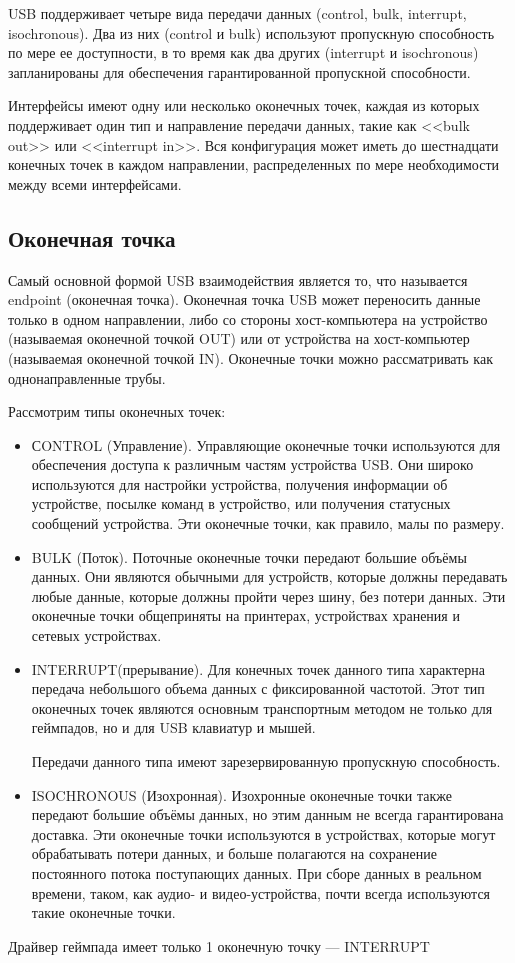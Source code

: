 USB поддерживает четыре вида передачи данных (control, bulk, interrupt, isochronous). Два из них (control и bulk) используют пропускную способность по мере ее доступности, в то время как два других (interrupt и isochronous) запланированы для обеспечения гарантированной пропускной способности.\par
Интерфейсы имеют одну или несколько оконечных точек, каждая из которых поддерживает один тип и направление передачи данных, такие как <<bulk out>> или <<interrupt in>>. Вся конфигурация может иметь до шестнадцати конечных точек в каждом направлении, распределенных по мере необходимости между всеми интерфейсами.\par

\subsection{Оконечная точка}
Самый основной формой USB взаимодействия является то, что называется endpoint
(оконечная точка). Оконечная точка USB может переносить данные только в одном
направлении, либо со стороны хост-компьютера на устройство (называемая оконечной точкой
OUT) или от устройства на хост-компьютер (называемая оконечной точкой IN). Оконечные
точки можно рассматривать как однонаправленные трубы.\par
Рассмотрим типы оконечных точек:
\begin{itemize}
	\item СONTROL (Управление). Управляющие оконечные точки используются для обеспечения доступа к различным
	частям устройства USB. Они широко используются для настройки устройства, получения
	информации об устройстве, посылке команд в устройство, или получения статусных
	сообщений устройства. Эти оконечные точки, как правило, малы по размеру.
	
	\item BULK (Поток). Поточные оконечные точки передают большие объёмы данных. Они являются обычными для устройств, которые должны передавать любые данные, которые должны пройти через шину, без потери данных.
	Эти оконечные точки общеприняты на принтерах, устройствах хранения и сетевых устройствах.
	
	\item INTERRUPT(прерывание). Для
	конечных точек данного типа характерна передача небольшого объема данных
	с фиксированной частотой. Этот тип оконечных точек являются основным транспортным методом не только для
	геймпадов, но и для USB клавиатур и мышей.
	
	Передачи данного типа имеют зарезервированную пропускную способность.
	\item ISOCHRONOUS (Изохронная). Изохронные оконечные точки также передают большие объёмы данных, но этим данным
	не всегда гарантирована доставка. Эти оконечные точки используются в устройствах,
	которые могут обрабатывать потери данных, и больше полагаются на сохранение
	постоянного потока поступающих данных. При сборе данных в реальном времени, таком,
	как аудио- и видео-устройства, почти всегда используются такие оконечные точки.
\end{itemize}\par
Драйвер геймпада имеет только 1 оконечную точку --- INTERRUPT

